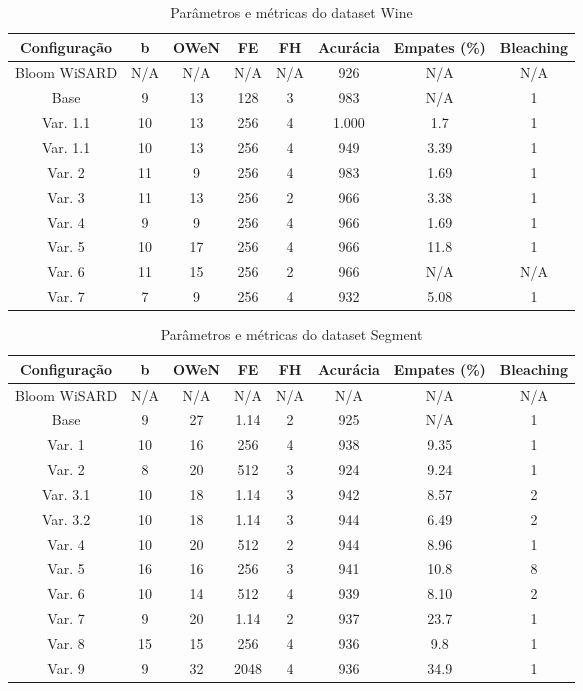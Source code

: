 \documentclass{article}
\begin{document}
{\begin{table}[H]
\caption{Parâmetros e métricas do dataset Wine}
\begin{tabular}{|c|c|c|c|c|c|c|c|}
\hline
\textbf{Configuração} & \textbf{b} & \textbf{OWeN} & \textbf{FE} & \textbf{FH} & \textbf{Acurácia} & \textbf{Empates (\%)} & \textbf{Bleaching} \\
\hline
Bloom WiSARD & N/A & N/A & N/A & N/A & 926 & N/A & N/A \\
\hline
Base & 9 & 13 & 128 & 3 & 983 & N/A & 1 \\
\hline
Var. 1.1 & 10 & 13 & 256 & 4 & 1.000 & 1.7 & 1 \\
\hline
Var. 1.1 & 10 & 13 & 256 & 4 & 949 & 3.39 & 1 \\
\hline
Var. 2 & 11 & 9 & 256 & 4 & 983 & 1.69 & 1 \\
\hline
Var. 3 & 11 & 13 & 256 & 2 & 966 & 3.38 & 1 \\
\hline
Var. 4 & 9 & 9 & 256 & 4 & 966 & 1.69 & 1 \\
\hline
Var. 5 & 10 & 17 & 256 & 4 & 966 & 11.8 & 1 \\
\hline
Var. 6 & 11 & 15 & 256 & 2 & 966 & N/A & N/A \\
\hline
Var. 7 & 7 & 9 & 256 & 4 & 932 & 5.08 & 1 \\
\hline
\end{tabular}
\end{table}

\begin{table}[H]
\caption{Parâmetros e métricas do dataset Segment}
\begin{tabular}{|c|c|c|c|c|c|c|c|}
\hline
\textbf{Configuração} & \textbf{b} & \textbf{OWeN} & \textbf{FE} & \textbf{FH} & \textbf{Acurácia} & \textbf{Empates (\%)} & \textbf{Bleaching} \\
\hline
Bloom WiSARD & N/A & N/A & N/A & N/A & N/A & N/A & N/A \\
\hline
Base & 9 & 27 & 1.14 & 2 & 925 & N/A & 1 \\
\hline
Var. 1 & 10 & 16 & 256 & 4 & 938 & 9.35 & 1 \\
\hline
Var. 2 & 8 & 20 & 512 & 3 & 924 & 9.24 & 1 \\
\hline
Var. 3.1 & 10 & 18 & 1.14 & 3 & 942 & 8.57 & 2 \\
\hline
Var. 3.2 & 10 & 18 & 1.14 & 3 & 944 & 6.49 & 2 \\
\hline
Var. 4 & 10 & 20 & 512 & 2 & 944 & 8.96 & 1 \\
\hline
Var. 5 & 16 & 16 & 256 & 3 & 941 & 10.8 & 8 \\
\hline
Var. 6 & 10 & 14 & 512 & 4 & 939 & 8.10 & 2 \\
\hline
Var. 7 & 9 & 20 & 1.14 & 2 & 937 & 23.7 & 1 \\
\hline
Var. 8 & 15 & 15 & 256 & 4 & 936 & 9.8 & 1 \\
\hline
Var. 9 & 9 & 32 & 2048 & 4 & 936 & 34.9 & 1 \\
\hline
\end{tabular}
\end{table}

}
\end{document}
